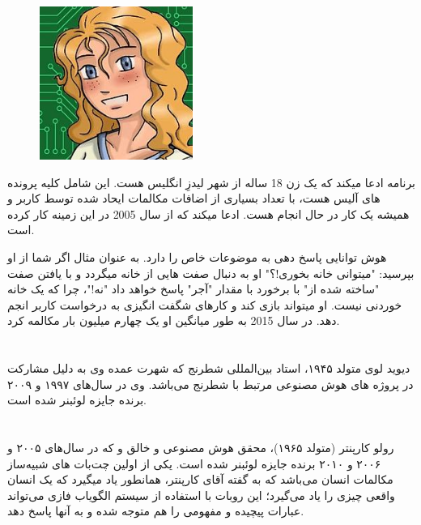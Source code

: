 \documentclass[18pt,a4paper]{report}
\begin{document}
\begin{figure}
	\begin{center}
		\includegraphics[width=5cm, height=5cm]{imgs/Mitsuku.jpg}
		\label{Mitsuku image}
		\caption{}
	\end{center}
\end{figure} 	
 	
 برنامه 	 ادعا میکند که یک زن 18 ساله از شهر لیدزِ انگلیس هست. این شامل کلیه پرونده های  آلیس هست، با تعداد بسیاری از اضافات مکالمات ایحاد شده توسط کاربر و همیشه یک کار در حال انجام هست.  ادعا میکند که از سال 2005 در این زمینه کار کرده است. 
  
 هوش  توانایی پاسخ دهی به موضوعات خاص را دارد. به عنوان مثال اگر شما از او بپرسید: "میتوانی خانه بخوری!؟" او به دنبال صفت هایی از خانه میگردد و با یافتن صفت "ساخته شده از" با برخورد با مقدار "آجر" پاسخ خواهد داد "نه!"، چرا که یک خانه خوردنی نیست. او میتواند بازی کند و کارهای شگفت انگیزی به درخواست کاربر انجم دهد. در سال 2015 به طور میانگین او یک چهارم میلیون بار مکالمه کرد. 
 


 \section{}
دیوید لوی متولد ۱۹۴۵، استاد بین‌المللی شطرنج که شهرت عمده وی به دلیل مشارکت در پروژه های هوش مصنوعی مرتبط با شطرنج می‌باشد.
وی در سال‌های ۱۹۹۷ و ۲۰۰۹ برنده جایزه لوئبنر شده است.	 

\section{}
رولو کارپنتر (متولد ۱۹۶۵)، محقق هوش مصنوعی و خالق  و  که در سال‌های ۲۰۰۵ و ۲۰۰۶ و ۲۰۱۰ برنده جایزه لوئبنر شده است.
 یکی از اولین چت‌بات های شبیه‌ساز مکالمات انسان می‌باشد که به گفته آقای کارپنتر، همانطور یاد ‌میگیرد که یک انسان واقعی چیزی را یاد می‌گیرد؛ این روبات با استفاده از سیستم الگویاب فازی می‌تواند عبارات پیچیده و مفهومی را هم متوجه شده و به آنها پاسخ دهد.
 
\end{document}
